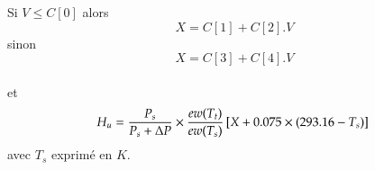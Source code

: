 Si $V \le C[0]$ alors \\ 
$$ 
X = C[1] + C[2].V 
$$
sinon \\ 
$$ 
X = C[3] + C[4].V 
$$ \\
et 
$$
H_u = \frac{P_s}{P_s + \Delta P} \times 
      \frac{ew(T_t)}{ew(T_s)}
      \left[ X + 
       0.075 \times (293.16 - T_s) \right] \\
$$
avec $T_s$ exprim\'e en $K$.
